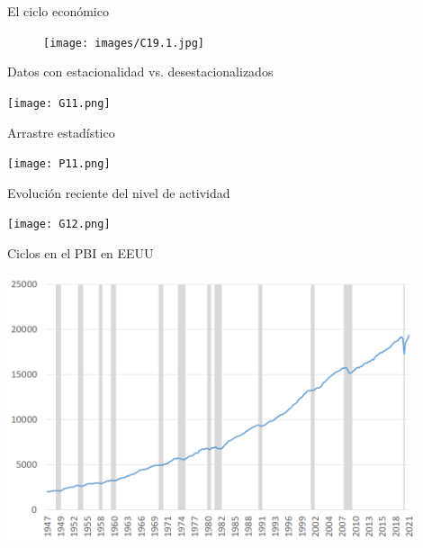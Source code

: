 \documentclass{beamer}
\begin{document}
\begin{frame}{El ciclo económico}
    \begin{figure} [H]   
\texttt{[image: images/C19.1.jpg]}
\label{fig:19.1}
\end{figure}

\end{frame}



\begin{frame}{Datos con estacionalidad vs. desestacionalizados}

\centering\texttt{[image: G11.png]}\

\end{frame}


\begin{frame}{Arrastre estadístico}

\centering\texttt{[image: P11.png]}\

\end{frame}


\begin{frame}{Evolución reciente del nivel de actividad}

\centering\texttt{[image: G12.png]}\

\end{frame}





\begin{frame}{Ciclos en el PBI en EEUU}

\centering\includegraphics[width=12cm]{USA_Rec.png}\

\end{frame}
\end{document}
